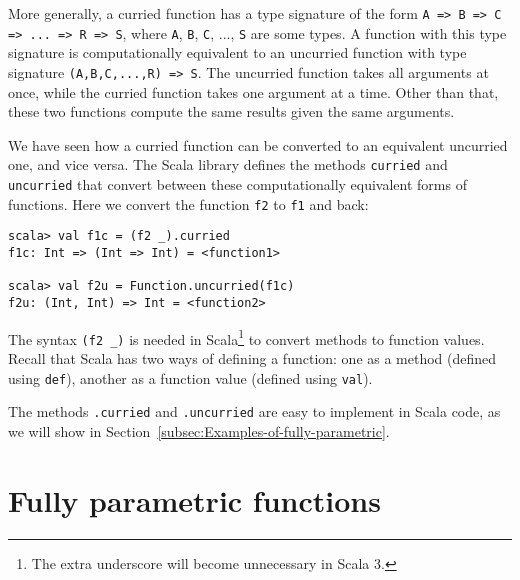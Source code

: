 More generally, a curried function has a type signature of the form
\lstinline!A => B => C => ... => R => S!,
where \lstinline!A!, \lstinline!B!,
\lstinline!C!, ..., \lstinline!S!
are some types. A function with this type signature is computationally
equivalent to an uncurried function with
type signature \lstinline!(A,B,C,...,R) => S!.
The uncurried function takes all arguments at once, while the curried
function takes one argument at a time. Other than that, these two
functions compute the same results given the same arguments.

We have seen how a curried function can be converted to an equivalent
uncurried one, and vice versa. The Scala library defines the methods
\lstinline!curried! and
\lstinline!uncurried! that
convert between these computationally equivalent forms of functions.
Here we convert the function \lstinline!f2!
to \lstinline!f1! and back:
\begin{lstlisting}
scala> val f1c = (f2 _).curried
f1c: Int => (Int => Int) = <function1>

scala> val f2u = Function.uncurried(f1c)
f2u: (Int, Int) => Int = <function2> 
\end{lstlisting}
The syntax \lstinline!(f2 _)!
is needed in Scala\footnote{The extra underscore will become unnecessary in Scala 3.}
to convert methods to function values. Recall that Scala has two ways
of defining a function: one as a method (defined
using \lstinline!def!),
another as a function value (defined using
\lstinline!val!). 

The methods \lstinline!.curried!
and \lstinline!.uncurried!
are easy to implement in Scala code, as we will show in Section~\ref{subsec:Examples-of-fully-parametric}.

\section{Fully parametric functions\label{sec:Fully-parametric-functions}}

